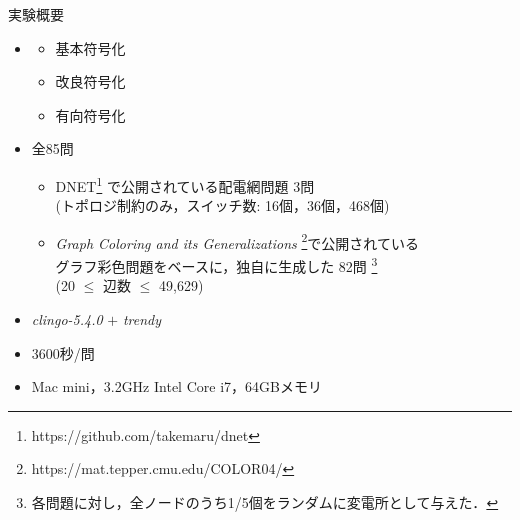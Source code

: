 \documentclass[dvipdfmx,11pt]{beamer}
\begin{document}
\begin{frame}{実験概要}
  \renewcommand{\thefootnote}{\fnsymbol{footnote}}
  \setcounter{footnote}{1}
  \begin{itemize}
  \item {}
    \begin{itemize}
     \item 基本符号化
     \item 改良符号化
     \item 有向符号化
    \end{itemize}
  \item {} 全85問
    \begin{itemize}
    \item DNET\footnote{https://github.com/takemaru/dnet}%
      で公開されている配電網問題 3問 \\ (トポロジ制約のみ，スイッチ数:
      16個，36個，468個)
    \item \textit{Graph Coloring and its Generalizations}
      \footnote{https://mat.tepper.cmu.edu/COLOR04/}で公開されている \\
      グラフ彩色問題をベースに，独自に生成した 82問 
      \footnote{各問題に対し，全ノードのうち1/5個をランダムに変電所として与えた．}\\
      (20 $\leq$ 辺数 $\leq$ 49,629)
    \end{itemize}
  \item {} \textit{clingo-5.4.0} $+$ \textit{trendy}
  \item {} 3600秒/問
  \item {} Mac mini，3.2GHz Intel Core i7，64GBメモリ
  \end{itemize}
\end{frame}
\end{document}

